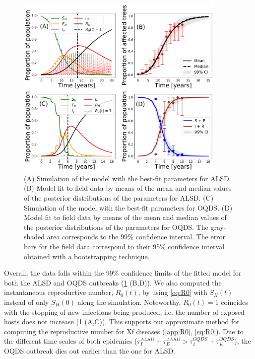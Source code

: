 \begin{figure}[H]
    \centering
    \includegraphics[width=0.9\textwidth]{Figures/BayesianInference.pdf}
    \caption{(A) Simulation of the model with the best-fit parameters for
        ALSD. (B) Model fit to field data by means of the mean and median
        values of the
        posterior distributions of the parameters for ALSD. (C) Simulation of
        the model
        with the best-fit parameters for OQDS. (D) Model fit to field data by
        means of
        the mean and median values of the posterior distributions of the
        parameters for
        OQDS. The gray-shaded area corresponds to the 99\% confidence interval.
        The
        error bars for the field data correspond to their 95\% confidence
        interval
        obtained with a bootstrapping technique.}
    \label{fig:best_fit_model}
\end{figure}

Overall, the data falls within the 99\% confidence limits of the fitted
model for both the ALSD and OQDS outbreaks (\cref{fig:best_fit_model} (B,D)).
We
also computed the instantaneous reproductive number, $R_0(t)$, by using
\cref{eq:R0} with $S_H(t)$ instead of only $S_H(0)$ along the simulation.
Noteworthy, $R_0(t)=1$ coincides with the stopping of new infections being
produced, i.e. the number of exposed hosts does not increase
(\cref{fig:best_fit_model} (A,C)). This supports our approximate method for
computing the reproductive number for Xf diseases (\cref{app:R0},
\cref{eq:R0}). Due to the different time scales of both epidemics
($\tau_I^{ALSD}+\tau_E^{ALSD} > \tau_I^{OQDS}+\tau_E^{OQDS}$), the OQDS
outbreak dies out earlier than the one for ALSD.

